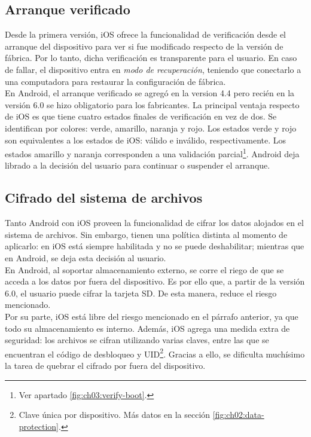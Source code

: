 \subsection{Arranque verificado}
Desde la primera versión, iOS ofrece la funcionalidad de verificación desde el arranque del dispositivo para ver si fue modificado respecto de la versión de fábrica. Por lo tanto, dicha verificación es transparente para el usuario. En caso de fallar, el dispositivo entra en \emph{modo de recuperación}, teniendo que conectarlo a una computadora para restaurar la configuración de fábrica.\\

En Android, el arranque verificado se agregó en la version 4.4 pero recién en la versión 6.0 se hizo obligatorio para los fabricantes. La principal ventaja respecto de iOS es que tiene cuatro estados finales de verificación en vez de dos. Se identifican por colores: verde, amarillo, naranja y rojo. Los estados verde y rojo son equivalentes a los estados de iOS: válido e inválido, respectivamente. Los estados amarillo y naranja corresponden a una validación parcial\footnote{Ver apartado \ref{fig:ch03:verify-boot}.}. Android deja librado a la decisión del usuario para continuar o suspender el arranque.
\subsection{Cifrado del sistema de archivos}
Tanto Android con iOS proveen la funcionalidad de cifrar los datos alojados en el sistema de archivos. Sin embargo, tienen una política distinta al momento de aplicarlo: en iOS está siempre habilitada y no se puede deshabilitar; mientras que en Android, se deja esta decisión al usuario.\\

En Android, al soportar almacenamiento externo, se corre el riego de que se acceda a los datos por fuera del dispositivo. Es por ello que, a partir de la versión 6.0, el usuario puede cifrar la tarjeta SD. De esta manera, reduce el riesgo mencionado.\\

Por su parte, iOS está libre del riesgo mencionado en el párrafo anterior, ya que todo su almacenamiento es interno. Además, iOS agrega una medida extra de seguridad: los archivos se cifran utilizando varias claves, entre las que se encuentran el código de desbloqueo y UID\footnote{Clave única por dispositivo. Más datos en la sección \ref{fig:ch02:data-protection}.}. Gracias a ello, se dificulta muchísimo la tarea de quebrar el cifrado por fuera del dispositivo.
